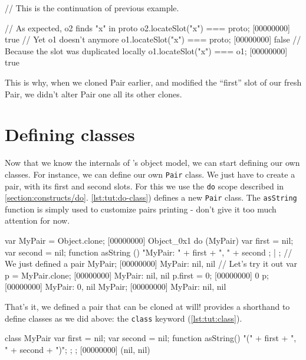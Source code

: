 \begin{urbiscript}[caption=Inspecting copy on write,
  label=lst:tut:check-copy-on-write, name=cow]
// This is the continuation of previous example.

// As expected, o2 finds "x" in proto
o2.locateSlot("x") === proto;
[00000000] true
// Yet o1 doesn't anymore
o1.locateSlot("x") === proto;
[00000000] false
// Because the slot was duplicated locally
o1.locateSlot("x") === o1;
[00000000] true
\end{urbiscript}

This is why, when we cloned Pair earlier, and modified the ``first''
slot of our fresh Pair, we didn't alter Pair one all its other clones.

\section{Defining classes}

Now that we know the internals of \urbi's object model, we can start
defining our own classes. For instance, we can define our own
\lstinline{Pair} class. We just have to create a pair, with its first and
second slots. For this we use the \lstinline{do} scope described in
\autoref{section:constructs/do}. \autoref{lst:tut:do-class}) defines a new
\lstinline{Pair} class. The \lstinline{asString} function is simply used to
customize pairs printing - don't give it too much attention for now.

\begin{urbiscript}[caption=Defining our own \lstinline{MyPair} class,
  label=lst:tut:do-class]
var MyPair = Object.clone;
[00000000] Object_0x1
do (MyPair)
{
  var first = nil;
  var second = nil;
  function asString ()
  {
    "MyPair: " + first + ", " + second
  };
} | {};
// We just defined a pair
MyPair;
[00000000] MyPair: nil, nil
// Let's try it out
var p = MyPair.clone;
[00000000] MyPair: nil, nil
p.first = 0;
[00000000] 0
p;
[00000000] MyPair: 0, nil
MyPair;
[00000000] MyPair: nil, nil
\end{urbiscript}

That's it, we defined a pair that can be cloned at will! \us
provides a shorthand to define classes as we did above: the
\lstinline{class} keyword (\autoref{lst:tut:class}).

\begin{urbiscript}[caption=Using the \lstinline{class} construct,
  label=lst:tut:class, name=my-pair]
class MyPair
{
  var first = nil;
  var second = nil;
  function asString() { "(" + first + ", " + second + ")"; };
};
[00000000] (nil, nil)
\end{urbiscript}

